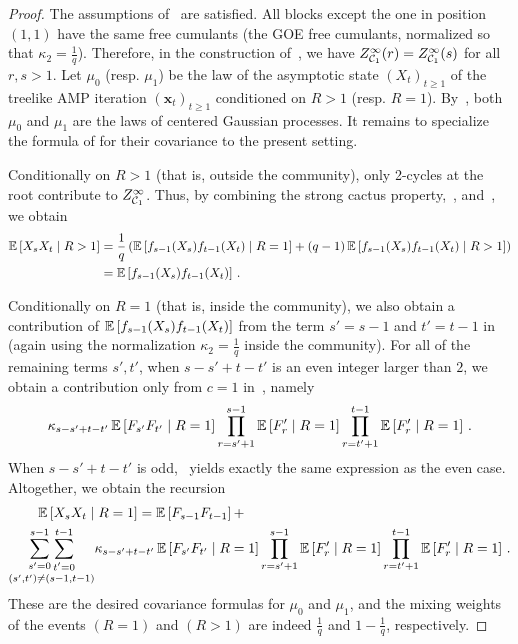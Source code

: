 \begin{proof}
    The assumptions of~ are satisfied. All
    blocks except the one in position $(1,1)$ have the same
    free cumulants (the GOE free cumulants, normalized so that $\kappa_2 = \frac 1 q$). Therefore, in the construction of~, we have $Z^\infty_{{\cal C}_1}(r) = Z^\infty_{{\cal C}_1}(s)$ for all $r,s>1$. Let $\mu_0$ (resp. $\mu_1$) be
    the law of the asymptotic state
    $(X_t)_{t\ge 1}$ of the treelike AMP iteration $(\bm x_t)_{t\ge 1}$ conditioned on $R>1$ (resp. $R=1$). By~, both $\mu_0$ and $\mu_1$ are the laws of centered Gaussian processes.
    It remains to specialize the formula of  for their covariance 
    to the present setting. 
    
    Conditionally
    on $R>1$ (that is, outside the community), only 2-cycles
    at the root contribute to $Z^\infty_{{\cal C}_1}$. Thus, by
    combining the strong cactus property,~,
    and~, we obtain
    \begin{align*}
        \operatorname*{\mathbb{E}} \left[X_s X_t\mid R >1\right] &= \frac 1q \left(\operatorname*{\mathbb{E}} \left[f_{s-1}(X_s) f_{t-1}(X_t) \mid R = 1\right] + (q-1) \operatorname*{\mathbb{E}} \left[f_{s-1}(X_s) f_{t-1}(X_t) \mid R > 1\right]\right)\\
        &= \operatorname*{\mathbb{E}} \left[f_{s-1}(X_s) f_{t-1}(X_t)\right]\,.
    \end{align*}
    
    Conditionally on $R=1$ (that is, inside
    the community), we also obtain 
    a contribution of $\operatorname*{\mathbb{E}} \left[f_{s-1}(X_s) f_{t-1}(X_t)\right]$ from the term
    $s'=s-1$ and $t'=t-1$ in~ (again using the normalization $\kappa_2 = \frac 1q$ inside the community).
    For all of the remaining terms $s',t'$,
    when $s-s' + t-t'$ is an even
    integer larger than $2$, we obtain
    a contribution only from $c=1$
    in~, namely
    \[
        \kappa_{s-s'+t-t'} \operatorname*{\mathbb{E}}\left[ F_{s'} F_{t'}\mid R=1\right]\prod_{r=s'+1}^{s-1} \operatorname*{\mathbb{E}}\left[ F'_{r}\mid R=1\right]\prod_{r=t'+1}^{t-1} \operatorname*{\mathbb{E}}\left[ F'_{r}\mid R=1\right]\,.
    \]
    When $s-s'+t-t'$ is odd,~ yields exactly the same expression as the even case.
    Altogether, we obtain the recursion
    \begin{align*}
        &\qquad\operatorname*{\mathbb{E}}\left[X_s X_t\mid R=1\right] = \operatorname*{\mathbb{E}} \left[F_{s-1} F_{t-1}\right] + \\
        &\underset{(s',t') \neq (s-1,t-1)}{\sum_{s'=0}^{s-1} \sum_{\substack{t'=0}}^{t-1}} \kappa_{s-s'+t-t'} \operatorname*{\mathbb{E}}\left[ F_{s'} F_{t'}\mid R=1\right] \prod_{r=s'+1}^{s-1} \operatorname*{\mathbb{E}}\left[ F'_{r}\mid R=1\right]\prod_{r=t'+1}^{t-1} \operatorname*{\mathbb{E}}\left[ F'_{r}\mid R=1\right] \,.
    \end{align*}
    These are the desired covariance
    formulas for $\mu_0$ and $\mu_1$, and the mixing weights
    of the events $(R=1)$ and $(R>1)$ are indeed $\frac 1q$ and $1-\frac 1 q$, respectively.
\end{proof}

